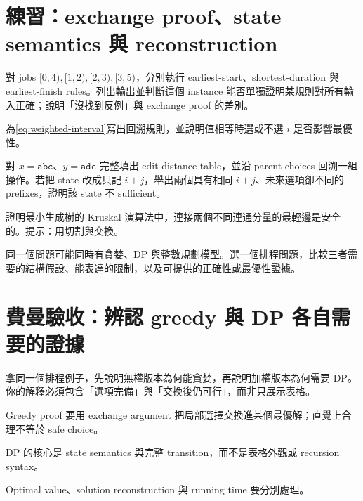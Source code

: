 \documentclass[11pt,a4paper,oneside,openany]{book}
\begin{document}
\section{練習：exchange proof、state semantics 與 reconstruction}
\begin{exercise}
對 jobs $[0,4),[1,2),[2,3),[3,5)$，分別執行 earliest-start、shortest-duration 與 earliest-finish rules。列出輸出並判斷這個 instance 能否單獨證明某規則對所有輸入正確；說明「沒找到反例」與 exchange proof 的差別。
\end{exercise}
\begin{exercise}
\label{ex:weighted-reconstruct}
為\cref{eq:weighted-interval}寫出回溯規則，並說明值相等時選或不選 $i$ 是否影響最優性。
\end{exercise}
\begin{exercise}
對 $x=\texttt{abc}$、$y=\texttt{adc}$ 完整填出 edit-distance table，並沿 parent choices 回溯一組操作。若把 state 改成只記 $i+j$，舉出兩個具有相同 $i+j$、未來選項卻不同的 prefixes，證明該 state 不 sufficient。
\end{exercise}
\begin{exercise}
證明最小生成樹的 Kruskal 演算法中，連接兩個不同連通分量的最輕邊是安全的。提示：用切割與交換。
\end{exercise}
\begin{exercise}
同一個問題可能同時有貪婪、DP 與整數規劃模型。選一個排程問題，比較三者需要的結構假設、能表達的限制，以及可提供的正確性或最優性證據。
\end{exercise}

\section{費曼驗收：辨認 greedy 與 DP 各自需要的證據}
\begin{feynmancheck}
拿同一個排程例子，先說明無權版本為何能貪婪，再說明加權版本為何需要 DP。你的解釋必須包含「選項完備」與「交換後仍可行」，而非只展示表格。
\end{feynmancheck}
\begin{chapterrecap}
\item Greedy proof 要用 exchange argument 把局部選擇交換進某個最優解；直覺上合理不等於 safe choice。
\item DP 的核心是 state semantics 與完整 transition，而不是表格外觀或 recursion syntax。
\item Optimal value、solution reconstruction 與 running time 要分別處理。
\end{chapterrecap}
\end{document}
